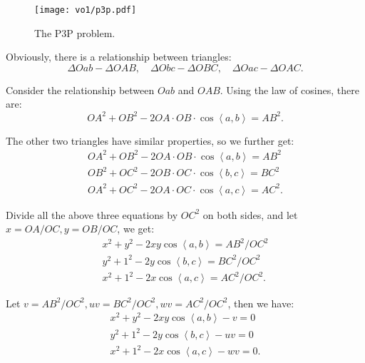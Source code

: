 \begin{figure}[!ht]
	\centering
	\texttt{[image: vo1/p3p.pdf]}
	\caption{The P3P problem.}
	\label{fig:p3p}
\end{figure}

Obviously, there is a relationship between triangles:
\begin{equation}
\Delta Oab - \Delta OAB, \quad \Delta Obc - \Delta OBC, \quad \Delta Oac - \Delta OAC.
\end{equation}

Consider the relationship between $Oab$ and $OAB$. Using the law of cosines, there are:
\begin{equation}
O{A^2} + O{B^2} - 2OA \cdot OB \cdot \cos \left\langle a,b \right \rangle  = A{B^2}.
\end{equation}

The other two triangles have similar properties, so we further get:
\begin{equation}
\begin{array}{l}
O{A^2} + O{B^2} - 2OA \cdot OB \cdot \cos \left\langle a,b \right \rangle  = A{B^2}\\
O{B^2} + O{C^2} - 2OB \cdot OC \cdot \cos \left\langle b,c \right \rangle  = B{C^2}\\
O{A^2} + O{C^2} - 2OA \cdot OC \cdot \cos \left\langle a,c \right \rangle  = A{C^2}.
\end{array}
\end{equation}

Divide all the above three equations by $OC^2$ on both sides, and let $x=OA/OC, y=OB/OC$, we get:
\begin{equation}
\begin{array}{l}
{x^2} + {y^2} - 2xy\cos \left\langle a,b \right \rangle  = A{B^2}/O{C^2}\\
{y^2} + {1^2} - 2y\cos \left\langle b,c \right \rangle  = B{C^2}/O{C^2}\\
{x^2} + {1^2} - 2x\cos \left\langle a,c \right \rangle  = A{C^2}/O{C^2}.
\end{array}
\end{equation}

Let $v = AB^2/OC^2, uv = BC^2/OC^2, wv = AC^2/OC^2$, then we have:
\begin{equation}
\begin{array}{l}
{x^2} + {y^2} - 2xy\cos \left\langle a,b \right \rangle  - v = 0\\
{y^2} + {1^2} - 2y\cos \left\langle b,c \right \rangle  - uv = 0\\
{x^2} + {1^2} - 2x\cos \left\langle a,c \right \rangle  - wv = 0.
\end{array}
\end{equation}

